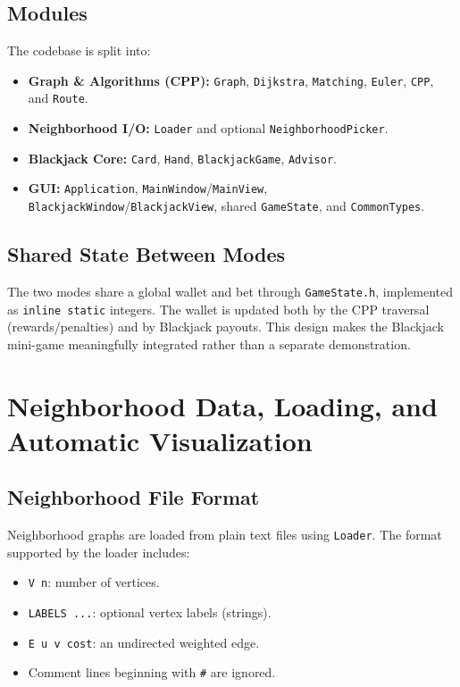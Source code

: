 \documentclass[conference]{IEEEtran}
\begin{document}
\subsection{Modules}
The codebase is split into:
\begin{itemize}
    \item \textbf{Graph \& Algorithms (CPP):} \texttt{Graph}, \texttt{Dijkstra}, \texttt{Matching}, \texttt{Euler}, \texttt{CPP}, and \texttt{Route}.
    \item \textbf{Neighborhood I/O:} \texttt{Loader} and optional \texttt{NeighborhoodPicker}.
    \item \textbf{Blackjack Core:} \texttt{Card}, \texttt{Hand}, \texttt{BlackjackGame}, \texttt{Advisor}.
    \item \textbf{GUI:} \texttt{Application}, \texttt{MainWindow}/\texttt{MainView}, \texttt{BlackjackWindow}/\texttt{BlackjackView}, shared \texttt{GameState}, and \texttt{CommonTypes}.
\end{itemize}

\subsection{Shared State Between Modes}
The two modes share a global wallet and bet through \texttt{GameState.h}, implemented as \texttt{inline static} integers.
The wallet is updated both by the CPP traversal (rewards/penalties) and by Blackjack payouts.
This design makes the Blackjack mini-game meaningfully integrated rather than a separate demonstration.

\section{Neighborhood Data, Loading, and Automatic Visualization}
\subsection{Neighborhood File Format}
Neighborhood graphs are loaded from plain text files using \texttt{Loader}.
The format supported by the loader includes:
\begin{itemize}
  \item \texttt{V n}: number of vertices.
  \item \texttt{LABELS ...}: optional vertex labels (strings).
  \item \texttt{E u v cost}: an undirected weighted edge.
  \item Comment lines beginning with \texttt{\#} are ignored.
\end{itemize}
\end{document}
